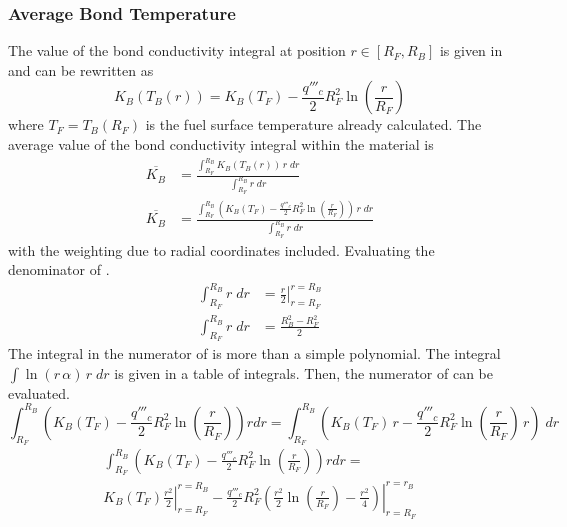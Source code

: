     \subsubsection{Average Bond Temperature}
      \label{sec:average_bond_temp}
      The value of the bond conductivity integral at position $r \in [R_F,R_B]$
      is given in  and can be rewritten as
      \begin{equation}
        K_B(T_B(r)) = K_B(T_F) - \frac{q'''_c}{2} R_F^2
          \ln\left(\frac{r}{R_F}\right)
      \end{equation}
      where $T_F=T_B(R_F)$ is the fuel surface temperature already calculated.
      The average value of the bond conductivity integral within the material is 
      \begin{align}
        \overline{K_B} &= \frac{\int_{R_F}^{R_B} K_B(T_B(r)) \, r \; dr}
          {\int_{R_F}^{R_B} r \; dr} \\
        \label{eq:kb_integral}
        \overline{K_B} &= \frac{\int_{R_F}^{R_B} \left( K_B(T_F) -
          \frac{q'''_c}{2} R_F^2 \ln\left(\frac{r}{R_F}\right) \right) \, r \;
          dr} {\int_{R_F}^{R_B} r \; dr}
      \end{align}
      with the weighting due to radial coordinates included.
      Evaluating the denominator of .
      \begin{align}
        \int_{R_F}^{R_B} r \; dr &= \left. \frac{r}{2} \right|_{r=R_F}^{r=R_B}\\
        \label{eq:kb_denominator}
        \int_{R_F}^{R_B} r \; dr &= \frac{R_B^2 - R_F^2}{2}
      \end{align}
      The integral in the numerator of  is more than a
      simple polynomial. The integral $\int \ln(r \, \alpha) \, r \; dr$ is given
      in a table of integrals. Then, the numerator of  can
      be evaluated. 
      \begin{equation}
        \int_{R_F}^{R_B} \left( K_B(T_F) - \frac{q'''_c}{2} R_F^2
          \ln\left(\frac{r}{R_F}\right) \right) r dr 
          = \int_{R_F}^{R_B}
          \left( K_B(T_F) \, r - \frac{q'''_c}{2}R_F^2
          \ln\left(\frac{r}{R_F}\right) \, r \right) \; dr
      \end{equation}
      \begin{multline}
        \int_{R_F}^{R_B} \left( K_B(T_F) - \frac{q'''_c}{2} R_F^2
          \ln\left(\frac{r}{R_F}\right) \right) r dr =\\
        \left. K_B(T_F) \frac{r^2}{2} \right|_{r=R_F}^{r=R_B} - 
          \left. \frac{q'''_c}{2}R_F^2 \left( \frac{r^2}{2}
          \ln\left(\frac{r}{R_F}\right) - \frac{r^2}{4} \right)
          \right|_{r=R_F}^{r=r_B}
      \end{multline}
